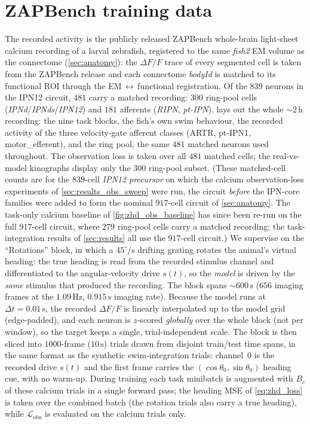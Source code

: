 \documentclass[11pt]{article}
\begin{document}
\section{ZAPBench training data}\label{method:zapbench}
The recorded activity is the publicly released ZAPBench whole-brain
light-sheet calcium recording of a larval zebrafish, registered to the
same \emph{fish2} EM volume as the connectome (\cref{sec:anatomy}): the
$\Delta F/F$ trace of every segmented cell is taken from the ZAPBench
release and each connectome \emph{bodyId} is matched to its functional
ROI through the EM\,$\leftrightarrow$\,functional registration. Of the
$839$ neurons in the IPN12 circuit, $481$ carry a matched recording:
$300$ ring-pool cells (\emph{IPNd}/\emph{IPNds}/\emph{IPN12}) and $181$
afferents (\emph{RIPN}, \emph{pt-IPN}).  lays out
the whole $\sim\!2\,\mathrm{h}$ recording: the nine task blocks, the fish's
own swim behaviour, the recorded activity of the three velocity-gate
afferent classes (ARTR, pt-IPN1, motor\_efferent), and the ring pool,
the same $481$ matched neurons used throughout. The observation loss is
taken over all $481$ matched cells; the real-vs-model kinographs display only
the $300$ ring-pool subset. (These matched-cell counts are for the
$839$-cell \emph{IPN12 precursor} on which the calcium observation-loss
experiments of \cref{sec:results_obs_sweep} were run, the circuit
\emph{before} the IPN-core families were added to form the nominal
$917$-cell circuit of \cref{sec:anatomy}. The task-only calcium baseline
of \cref{fig:zhd_obs_baseline} has since been re-run on the full
$917$-cell circuit, where $279$ ring-pool cells carry a matched
recording; the task-integration results of \cref{sec:results} all use
the $917$-cell circuit.) We supervise on the ``Rotations'' block, in which a
$45^\circ/\mathrm{s}$ drifting grating rotates the animal's virtual
heading: the true heading is read from the recorded stimulus channel and
differentiated to the angular-velocity drive $s(t)$, so the \emph{model}
is driven by the \emph{same} stimulus that produced the recording. The
block spans ${\sim}600\,\mathrm{s}$ ($656$ imaging frames at the
$1.09\,\mathrm{Hz}$, $0.915\,\mathrm{s}$ imaging rate). Because the model
runs at $\Delta t = 0.01\,\mathrm{s}$, the recorded $\Delta F/F$ is
linearly interpolated up to the model grid (edge-padded), and each neuron
is $z$-scored \emph{globally} over the whole block (not per window),
so the target keeps a single, trial-independent scale. The block is then
sliced into $1000$-frame ($10\,\mathrm{s}$) trials drawn from disjoint
train/test time spans, in the same format as the synthetic
swim-integration trials: channel~0 is the recorded drive $s(t)$ and the
first frame carries the $(\cos\theta_0,\sin\theta_0)$ heading cue, with no
warm-up. During training each task minibatch is augmented with $B_c$ of
these calcium trials in a single forward pass; the heading MSE of
\cref{eq:zhd_loss} is taken over the combined batch (the rotation trials
also carry a true heading), while $\mathcal{L}_{\mathrm{obs}}$ is
evaluated on the calcium trials only.
\end{document}
